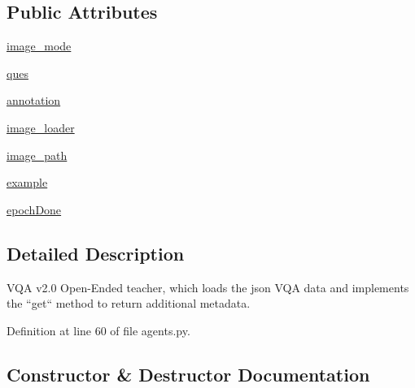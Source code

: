 \subsection*{Public Attributes}
\begin{DoxyCompactItemize}
\item 
\hyperlink{classparlai_1_1tasks_1_1vqa__v2_1_1agents_1_1OeTeacher_a8f3225181d7dd82bc4f6356a45377e77}{image\+\_\+mode}
\item 
\hyperlink{classparlai_1_1tasks_1_1vqa__v2_1_1agents_1_1OeTeacher_a97e56f91309795ad390573355585a2f3}{ques}
\item 
\hyperlink{classparlai_1_1tasks_1_1vqa__v2_1_1agents_1_1OeTeacher_ad195c1182da5744f020d6181a7b99218}{annotation}
\item 
\hyperlink{classparlai_1_1tasks_1_1vqa__v2_1_1agents_1_1OeTeacher_a432beaf6869117f7ed76cb78d876996a}{image\+\_\+loader}
\item 
\hyperlink{classparlai_1_1tasks_1_1vqa__v2_1_1agents_1_1OeTeacher_a7a1259d5b801f1e7984700a31405189f}{image\+\_\+path}
\item 
\hyperlink{classparlai_1_1tasks_1_1vqa__v2_1_1agents_1_1OeTeacher_a949cbafa55cf6c1175a90c3b54d68426}{example}
\item 
\hyperlink{classparlai_1_1tasks_1_1vqa__v2_1_1agents_1_1OeTeacher_ae8240944a80920ce505269347bea3c6b}{epoch\+Done}
\end{DoxyCompactItemize}


\subsection{Detailed Description}
\begin{DoxyVerb}VQA v2.0 Open-Ended teacher, which loads the json VQA data and implements the
``get`` method to return additional metadata.
\end{DoxyVerb}
 

Definition at line 60 of file agents.\+py.



\subsection{Constructor \& Destructor Documentation}
\mbox{\label{classparlai_1_1tasks_1_1vqa__v2_1_1agents_1_1OeTeacher_ae97aade64cf9108a8cb022721a13ebd4}} 
